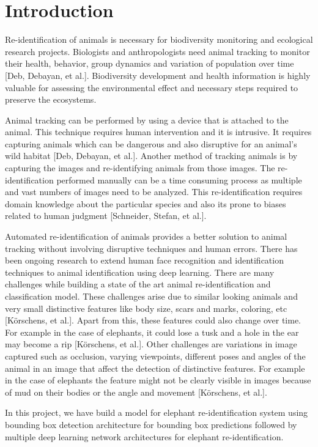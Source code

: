 \documentclass[10pt,twocolumn,letterpaper]{article}
\begin{document}
\section{Introduction}
\label{sec:intro}

Re-identification of animals is necessary for biodiversity monitoring and ecological research projects. Biologists and anthropologists need animal tracking to monitor their health, behavior, group dynamics and variation of population over time [Deb, Debayan, et al.]. Biodiversity development and health information is highly valuable for assessing the environmental effect and necessary steps required to preserve the ecosystems.

Animal tracking can be performed by using a device that is attached to the animal. This technique requires human intervention and it is intrusive. It requires capturing animals which can be dangerous and also disruptive for an animal's wild habitat [Deb, Debayan, et al.]. Another method of tracking animals is by capturing the images and re-identifying animals from those images. The re-identification performed manually can be a time consuming process as multiple and vast numbers of images need to be analyzed. This re-identification requires domain knowledge about the particular species and also its prone to biases related to human judgment [Schneider, Stefan, et al.].

Automated re-identification of animals provides a better solution to animal tracking without involving disruptive techniques and human errors. There has been ongoing research to extend human face recognition and identification techniques to animal identification using deep learning. There are many challenges while building a state of the art animal re-identification and classification model. These challenges arise due to similar looking animals and very small distinctive features like body size, scars and marks, coloring, etc [Körschens, et al.]. Apart from this, these features could also change over time. For example in the case of elephants, it could lose a tusk and a hole in the ear may become a rip [Körschens, et al.]. Other challenges are variations in image captured such as occlusion, varying viewpoints, different poses and angles of the animal in an image that affect the detection of distinctive features. For example in the case of elephants the feature might not be clearly visible in images because of mud on their bodies or the angle and movement [Körschens, et al.].

In this project, we have build a model for elephant re-identification system using bounding box detection architecture for bounding box predictions followed by multiple deep learning network architectures for elephant re-identification.
\end{document}
